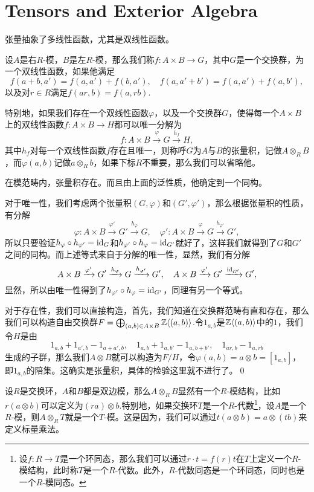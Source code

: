 \appendix
\renewcommand{\thepara}{\Alph{chapter}.\arabic{para}}

\chapter{Tensors and Exterior Algebra}

张量抽象了多线性函数，尤其是双线性函数。

\para 设$A$是右$R$-模，$B$是左$R$-模，那么我们称$f:A\times B\to G$，其中$G$是一个交换群，为一个双线性函数，如果他满足
\[
	f(a+b,a')=f(a,a')+f(b,a'),\quad f(a,a'+b')=f(a,a')+f(a,b'),
\]
以及对$r\in R$满足$f(ar,b)=f(a,rb)$.

特别地，如果我们存在一个双线性函数$\varphi$，以及一个交换群$G$，使得每一个$A\times B$上的双线性函数$f:A\times B\to H$都可以唯一分解为
\[
	f:A\times B\xrightarrow{\varphi} G\xrightarrow{h_f}H,
\]
其中$h_f$对每一个双线性函数$f$存在且唯一，则称呼$G$为$A$与$B$的张量积，记做$A\otimes_R B$，而$\varphi(a,b)$记做$a\otimes_R b$，如果下标$R$不重要，那么我们可以省略他。

\lem 在模范畴内，张量积存在。而且由上面的泛性质，他确定到一个同构。

\proof 对于唯一性，我们考虑两个张量积$(G,\varphi)$和$(G',\varphi')$，那么根据张量积的性质，有分解
\[
	\varphi:A\times B\xrightarrow{\varphi'} G'\xrightarrow{h_{\varphi}}G,\quad \varphi':A\times B\xrightarrow{\varphi} G\xrightarrow{h_{\varphi'}}G',
\]
所以只要验证$h_\varphi\circ h_{\varphi'}=\operatorname{id}_{G}$和$h_{\varphi'}\circ h_{\varphi}=\operatorname{id}_{G'}$就好了，这样我们就得到了$G$和$G'$之间的同构。而上述等式来自于分解的唯一性，显然，我们有分解
\[
	A\times B\xrightarrow{\varphi'} G'\xrightarrow{h_{\varphi}}G\xrightarrow{h_{\varphi'}}G',\quad A\times B\xrightarrow{\varphi'} G'\xrightarrow{\operatorname{id}_{G'}}G',
\]
显然，所以由唯一性得到了$h_{\varphi'}\circ h_{\varphi}=\operatorname{id}_{G'}$，同理有另一个等式。

对于存在性，我们可以直接构造，首先，我们知道在交换群范畴有直和存在，那么我们可以构造自由交换群$F=\bigoplus_{(a,b)\in A\times B} \mathbb{Z}\langle (a,b)\rangle$.令$1_{a,b}$是$\mathbb{Z}\langle (a,b)\rangle$中的$1$，我们令$H$是由
\[
	1_{a,b}+1_{a',b}-1_{a+a',b},\quad 1_{a,b}+1_{a,b'}-1_{a,b+b'},\quad 1_{ar,b}-1_{a,rb}
\]
生成的子群，那么我们$A\otimes B$就可以构造为$F/H$，令$\varphi(a,b)=a\otimes b=[1_{a,b}]$，即$1_{a,b}$的陪集。这确实是张量积，具体的检验这里就不进行了。\qed

设$R$是交换环，$A$和$B$都是双边模，那么$A\otimes_R B$显然有一个$R$-模结构，比如$r(a\otimes b)$可以定义为$(ra)\otimes b$.特别地，如果交换环$T$是一个$R$-代数\footnote{设$f:R\to T$是一个环同态，那么我们可以通过$r\cdot t=f(r)t$在$T$上定义一个$R$-模结构，此时称$T$是一个$R$-代数。此外，$R$-代数同态是一个环同态，同时也是一个$R$-模同态。}，设$A$是一个$R$-模，则$A\otimes_R T$就是一个$T$-模。这是因为，我们可以通过$t(a\otimes b)=a\otimes (tb)$来定义标量乘法。

